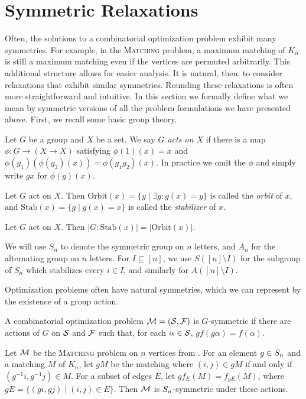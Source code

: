 \section{Symmetric Relaxations}
Often, the solutions to a combinatorial optimization problem exhibit many symmetries. For example, in the \textsc{Matching} problem, a maximum matching of $K_n$ is still a maximum matching even if the vertices are permuted arbitrarily. This additional structure allows for easier analysis. It is natural, then, to consider relaxations that exhibit similar symmetries. Rounding these relaxations is often more straightforward and intuitive. In this section we formally define what we mean by symmetric versions of all the problem formulations we have presented above. First, we recall some basic group theory.
\begin{definition}
Let $G$ be a group and $X$ be a set. We say \emph{$G$ acts on $X$} if there is a map $\phi: G \rightarrow (X \rightarrow X)$ satisfying $\phi(1)(x) = x$ and $\phi(g_1)(\phi(g_2)(x)) = \phi(g_1g_2)(x)$. In practice we omit the $\phi$ and simply write $gx$ for $\phi(g)(x)$.
\end{definition}
\begin{definition}
Let $G$ act on $X$. Then $\text{Orbit}(x) = \{y \mid \exists g: g(x) = y\}$ is called the \emph{orbit} of $x$, and $\text{Stab}(x) = \{g \mid g(x) = x\}$ is called the \emph{stabilizer} of $x$.
\end{definition}
\begin{fact}
Let $G$ act on $X$. Then $|G: \text{Stab}(x)| = |\text{Orbit}(x)|$.
\end{fact}
We will use $S_n$ to denote the symmetric group on $n$ letters, and $A_n$ for the alternating group on $n$ letters. For $I \subseteq [n]$, we use $S([n] \setminus I)$ for the subgroup of $S_n$ which stabilizes every $i \in I$, and similarly for $A([n]\setminus I)$.

Optimization problems often have natural symmetries, which we can represent by the existence of a group action.
\begin{definition}
A combinatorial optimization problem $\mathcal M = (\mathcal S, \mathcal F)$ is $G$-symmetric if there are actions of $G$ on $\mathcal S$ and $\mathcal F$ such that, for each $\alpha \in \mathcal S$, $gf(g\alpha) = f(\alpha)$.
\end{definition}
\begin{example}
Let $\mathcal M$ be the \textsc{Matching} problem on $n$ vertices from . For an element $g \in S_{n}$ and a matching $M$ of $K_n$, let $gM$ be the matching where $(i,j) \in gM$ if and only if $(g^{-1}i,g^{-1}j) \in M$. For a subset of edges $E$, let $gf_E(M) = f_{gE}(M)$, where $gE = \{(gi,gj) \mid (i,j) \in E\}$. Then $\mathcal M$ is $S_{n}$-symmetric under these actions.
\end{example} 


